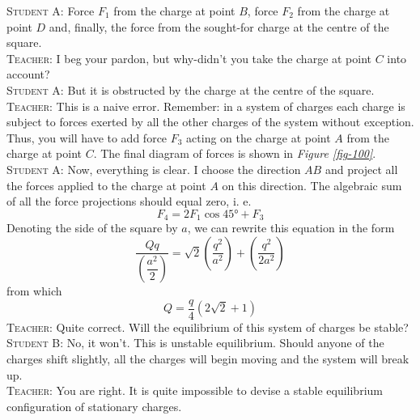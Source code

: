 \documentclass[a4paper,sfsidenotes]{tufte-book}
\begin{document}
\textsc{Student A:} Force $F_{1}$ from the charge at point $B$, force $F_{2}$ from the charge at point $D$ and, finally, the force from the sought-for charge at the centre of the square.
\\
\textsc{Teacher:} I beg your pardon, but why-didn't you take the charge at point $C$ into account?
\\
\textsc{Student A:} But it is obstructed by the charge at the centre of the square.
\\
\textsc{Teacher:} This is a naive error. Remember: in a system of charges each charge is subject to forces exerted by all the other charges of the system without exception. Thus, you will have to add force $F_{3}$ acting on the charge at point $A$ from the charge at point $C$. The final diagram of forces is shown in \emph{Figure \ref{fig-100}}.
\\
\textsc{Student A:} Now, everything is clear. I choose the direction $AB$ and project all the forces applied to the charge at point $A$ on this direction. The algebraic sum of all the force projections should equal zero, i. e.
\begin{equation*}%
F_{4} = 2F_{1} \cos \ang{45} + F_{3}
\end{equation*}
Denoting the side of the square by $a$, we can rewrite this equation in the form
\begin{equation*}%
\frac{Qq}{\left( \dfrac{a^{2}}{2} \right)} = \sqrt{2} \left( \frac{q^{2}}{a^{2}} \right)+ \left( \frac{q^{2}}{2a^{2}} \right)
\end{equation*}
from which
\begin{equation}%
Q = \frac{q}{4} \left( 2\sqrt{2} + 1 \right)
\label{eq-159}
\end{equation}
\textsc{Teacher:} Quite correct. Will the equilibrium of this system of charges be stable?
\\
\textsc{Student B:} No, it won't. This is unstable equilibrium. Should anyone of the charges shift slightly, all the charges will begin moving and the system will break up.
\\
\textsc{Teacher:} You are right. It is quite impossible to devise a stable equilibrium configuration of stationary charges.
\end{document}
